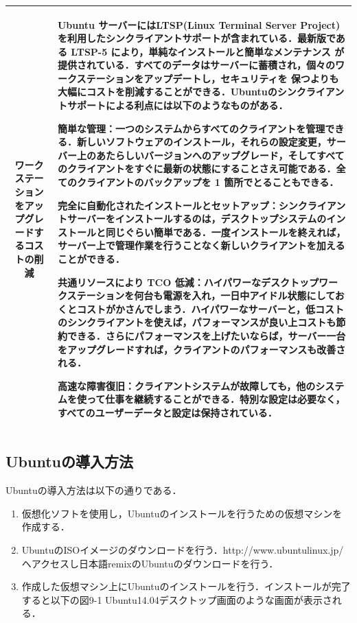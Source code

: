 \begin{tabular}{|c|p{}|}
 \hline
  ワークステーションをアップグレードするコストの削減 & Ubuntu サーバーにはLTSP(Linux Terminal Server Project)を利用したシンクライアントサポートが含まれている．最新版である LTSP-5 により，単純なインストールと簡単なメンテナンス が提供されている．すべてのデータはサーバーに蓄積され，個々のワークステーションをアップデートし，セキュリティを 保つよりも大幅にコストを削減することができる．Ubuntuのシンクライアントサポートによる利点には以下のようなものがある．
 \par 簡単な管理：一つのシステムからすべてのクライアントを管理できる．新しいソフトウェアのインストール，それらの設定変更，サーバー上のあたらしいバージョンへのアップグレード，そしてすべてのクライアントをすぐに最新の状態にすることさえ可能である．全てのクライアントのバックアップを 1 箇所でとることもできる．
 \par 完全に自動化されたインストールとセットアップ：シンクライアントサーバーをインストールするのは，デスクトップシステムのインストールと同じぐらい簡単である．一度インストールを終えれば，サーバー上で管理作業を行うことなく新しいクライアントを加えることができる．
 \par 共通リソースにより TCO 低減：ハイパワーなデスクトップワークステーションを何台も電源を入れ，一日中アイドル状態にしておくとコストがかさんでしまう．ハイパワーなサーバーと，低コストのシンクライアントを使えば，パフォーマンスが良い上コストも節約できる．さらにパフォーマンスを上げたいならば，サーバー一台をアップグレードすれば，クライアントのパフォーマンスも改善される．
 \par 高速な障害復旧：クライアントシステムが故障しても，他のシステムを使って仕事を継続することができる．特別な設定は必要なく，すべてのユーザーデータと設定は保持されている．\\\hline
\end{tabular}


\subsection{Ubuntuの導入方法}
 Ubuntuの導入方法は以下の通りである．
\begin{enumerate}
\item 仮想化ソフトを使用し，Ubuntuのインストールを行うための仮想マシンを作成する．
\item UbuntuのISOイメージのダウンロードを行う．http://www.ubuntulinux.jp/へアクセスし日本語remixのUbuntuのダウンロードを行う．
\item 作成した仮想マシン上にUbuntuのインストールを行う．インストールが完了すると以下の図9-1 Ubuntu14.04デスクトップ画面のような画面が表示される． 
\end{enumerate}


